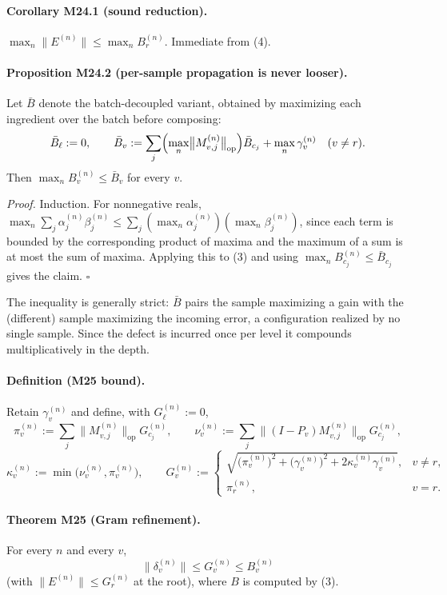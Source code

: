 \paragraph{Corollary M24.1 (sound reduction).}
$\displaystyle\max_n\bigl\|E^{(n)}\bigr\|\le\max_n B_r^{(n)}$.
Immediate from (4).

\paragraph{Proposition M24.2 (per-sample propagation is never looser).}
Let $\bar B$ denote the batch-decoupled variant, obtained by maximizing each
ingredient over the batch before composing:
\[
  \bar B_\ell:=0,\qquad
  \bar B_v:=\sum_j\Bigl(\max_n\bigl\|M_{v,j}^{(n)}\bigr\|_{\mathrm{op}}\Bigr)\bar B_{c_j}
  +\max_n\gamma_v^{(n)}\quad(v\ne r).
\]
Then $\max_nB_v^{(n)}\le\bar B_v$ for every $v$.

\emph{Proof.} Induction. For nonnegative reals,
$\max_n\sum_j\alpha_j^{(n)}\beta_j^{(n)}\le\sum_j(\max_n\alpha_j^{(n)})(\max_n\beta_j^{(n)})$,
since each term is bounded by the corresponding product of maxima and the
maximum of a sum is at most the sum of maxima. Applying this to (3) and using
$\max_nB_{c_j}^{(n)}\le\bar B_{c_j}$ gives the claim. $\square$

The inequality is generally strict: $\bar B$ pairs the sample maximizing a
gain with the (different) sample maximizing the incoming error, a
configuration realized by no single sample. Since the defect is incurred once
per level it compounds multiplicatively in the depth.

\paragraph{Definition (M25 bound).}
Retain $\gamma_v^{(n)}$ and define, with $G_\ell^{(n)}:=0$,
\[
  \pi_v^{(n)}:=\sum_j\bigl\|M_{v,j}^{(n)}\bigr\|_{\mathrm{op}}G_{c_j}^{(n)},
  \qquad
  \nu_v^{(n)}:=\sum_j\bigl\|(I-P_v)M_{v,j}^{(n)}\bigr\|_{\mathrm{op}}G_{c_j}^{(n)},
\]
\[
  \kappa_v^{(n)}:=\min\bigl(\nu_v^{(n)},\pi_v^{(n)}\bigr),
  \qquad
  G_v^{(n)}:=
  \begin{cases}
   \sqrt{\bigl(\pi_v^{(n)}\bigr)^2+\bigl(\gamma_v^{(n)}\bigr)^2
         +2\kappa_v^{(n)}\gamma_v^{(n)}}, & v\ne r,\\[1mm]
   \pi_r^{(n)}, & v=r.
  \end{cases}
\tag{7}
\]

\paragraph{Theorem M25 (Gram refinement).}
For every $n$ and every $v$,
\[
  \boxed{\;\bigl\|\delta_v^{(n)}\bigr\|\le G_v^{(n)}\le B_v^{(n)}\;}
\tag{8}
\]
(with $\|E^{(n)}\|\le G_r^{(n)}$ at the root), where $B$ is computed by (3).

